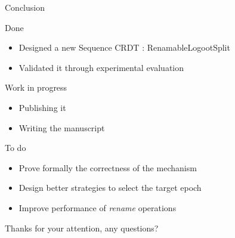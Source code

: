 \documentclass[10pt]{beamer}
\begin{document}
\begin{frame}{Conclusion}
  \begin{block}{Done}
    \vspace{-1mm}
    \begin{itemize}
      \item Designed a new Sequence \ac{CRDT} : RenamableLogootSplit
      \item Validated it through experimental evaluation
    \end{itemize}
  \end{block}

  \pause

  \begin{block}{Work in progress}
    \vspace{-1mm}
    \begin{itemize}
      \item Publishing it
      \item Writing the manuscript
    \end{itemize}
  \end{block}

  \pause

  \begin{block}{To do}
    \vspace{-1mm}
    \begin{itemize}
      \item Prove formally the correctness of the mechanism
      \item Design better strategies to select the target epoch
      \item Improve performance of \emph{rename} operations
    \end{itemize}
  \end{block}
\end{frame}

\begin{frame}[standout]
  Thanks for your attention, any questions?
  \vspace{3em}
  \begin{center}
    \ccby
  \end{center}
\end{frame}

\appendix
\end{document}
